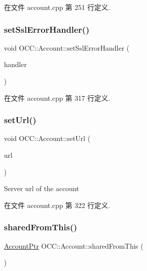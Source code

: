 在文件 account.\+cpp 第 251 行定义.

\mbox{\label{class_o_c_c_1_1_account_a19cd9fde665641af80c06c45a5dad5e1}} 
\subsubsection{\texorpdfstring{set\+Ssl\+Error\+Handler()}{setSslErrorHandler()}}
{\footnotesize\ttfamily void O\+C\+C\+::\+Account\+::set\+Ssl\+Error\+Handler (\begin{DoxyParamCaption}\item[{\hyperlink{class_o_c_c_1_1_abstract_ssl_error_handler}{Abstract\+Ssl\+Error\+Handler} $\ast$}]{handler }\end{DoxyParamCaption})}



在文件 account.\+cpp 第 317 行定义.

\mbox{\label{class_o_c_c_1_1_account_ae390d247463832a8b8b129e16dab32b9}} 
\subsubsection{\texorpdfstring{set\+Url()}{setUrl()}}
{\footnotesize\ttfamily void O\+C\+C\+::\+Account\+::set\+Url (\begin{DoxyParamCaption}\item[{const Q\+Url \&}]{url }\end{DoxyParamCaption})}

Server url of the account 

在文件 account.\+cpp 第 322 行定义.

\mbox{\label{class_o_c_c_1_1_account_a64e841a6e5d55baafd9c828c20628fbb}} 
\subsubsection{\texorpdfstring{shared\+From\+This()}{sharedFromThis()}}
{\footnotesize\ttfamily \hyperlink{namespace_o_c_c_a848616aedb9188e223c6b9867757fe69}{Account\+Ptr} O\+C\+C\+::\+Account\+::shared\+From\+This (\begin{DoxyParamCaption}{ }\end{DoxyParamCaption})}



